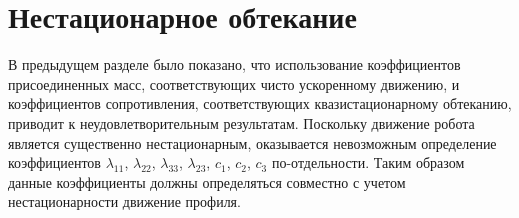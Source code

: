 %
%
%

\newpage

\section{Нестационарное обтекание}


В предыдущем разделе было показано, что использование коэффициентов присоединенных масс, соответствующих чисто ускоренному движению, и коэффициентов сопротивления, соответствующих квазистационарному обтеканию, приводит к неудовлетворительным результатам. Поскольку движение робота является существенно нестационарным, оказывается невозможным определение коэффициентов $\lambda_{11}$, $\lambda_{22}$, $\lambda_{33}$, $\lambda_{23}$, $c_1$, $c_2$, $c_3$ по-отдельности. Таким образом данные коэффициенты должны определяться совместно с учетом нестационарности движение профиля.

